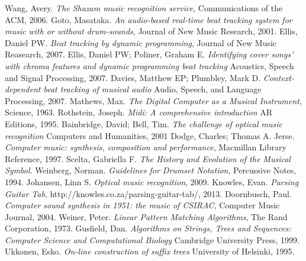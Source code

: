 \documentclass[12pt,twoside,notitlepage]{report}
\begin{document}

\begin{thebibliography}{99}
	Wang, Avery.
	\emph{The Shazam music recognition service},
	Communications of the ACM,
	2006.
	Goto, Masataka.
	\emph{An audio-based real-time beat tracking system for music with or without drum-sounds},
	Journal of New Music Research,
	2001.
	Ellis, Daniel PW.
	\emph{Beat tracking by dynamic programming},
	Journal of New Music Reasearch,
	2007.
	Ellis, Daniel PW; Poliner, Graham E.
	\emph{Identifying cover songs' with chroma features and dynamic programming beat tracking}
	Acoustics, Speech and Signal Processing,
	2007.
	Davies, Matthew EP; Plumbley, Mark D.
	\emph{Context-dependent beat tracking of musical audio}
	Audio, Speech, and Language Processing,
	2007.
	Mathews, Max.
	\emph{The Digital Computer as a Musical Instrument},
	Science,
	1963.
	Rothstein, Joseph.
	\emph{Midi: A comprehensive introduction}
	AR Editions,
	1995.
	Bainbridge, David; Bell, Tim.
	\emph{The challenge of optical music recognition}
	Computers and Humanities,
	2001
	Dodge, Charles; Thomas A. Jerse.
	\emph{Computer music: synthesis, composition and performance},
	Macmillan Library Reference, 
	1997.
	Scelta, Gabriella F.
	\emph{The History and Evolution of the Musical Symbol}.
	Weinberg, Norman.
	\emph{Guidelines for Drumset Notation},
	Percussive Notes,
	1994.
	Johansen, Linn S.
	\emph{Optical music recognition},
	2009.	
	Knowles, Evan.
	\emph{Parsing Guitar Tab},
	http://knowles.co.za/parsing-guitar-tab/,
	2013.
	Doornbusch, Paul.
	\emph{Computer sound synthesis in 1951: the music of CSIRAC},
	Computer Music Journal,
	2004.
	Weiner, Peter.
	\emph{Linear Pattern Matching Algorithms},
	The Rand Corporation,
	1973.
	Gusfield, Dan.
	\emph{Algorithms on Strings, Trees and Sequences: Computer Science and Computational Biology}
	Cambridge University Press,
	1999.
	Ukkonen, Esko.
	\emph{On-line construction of suffix trees}
	University of Helsinki,
	1995.


\end{thebibliography}
\cleardoublepage

\appendix
\end{document}
